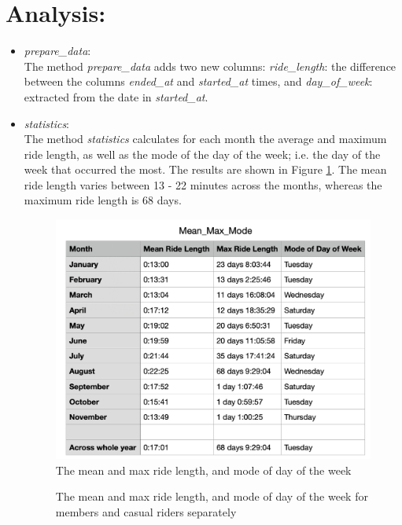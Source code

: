 \documentclass[12pt]{article}
\begin{document}
\section*{Analysis:}
\begin{itemize}
\item \textit{prepare\_data}:\\
	The method \textit{prepare\_data} adds two new columns: \textit{ride\_length}: the difference between the columns \textit{ended\_at} and \textit{started\_at} times, and \textit{day\_of\_week}: extracted from the date in \textit{started\_at}. 
	
\item \textit{statistics}:\\	
	The method \textit{statistics} calculates for each month the average and maximum ride length, as well as the mode of the day of the week; i.e. the day of the week that occurred the most. The results are shown in Figure \ref{fig9}. The mean ride length varies between 13 - 22 minutes across the months, whereas the maximum ride length is 68 days. 
	
	\begin{figure}[h]
	\centering
	\includegraphics[width=4 in, height = 3.2 in]{imgMeanMax1.png}
	\caption{The mean and max ride length, and mode of day of the week}
	\label{fig9}
	\end{figure}
	
	\begin{figure}[h]
	\centering
	\caption{The mean and max ride length, and mode of day of the week for members and casual riders separately}
	\label{fig10}
	\end{figure}
	
\end{itemize}
\end{document}
